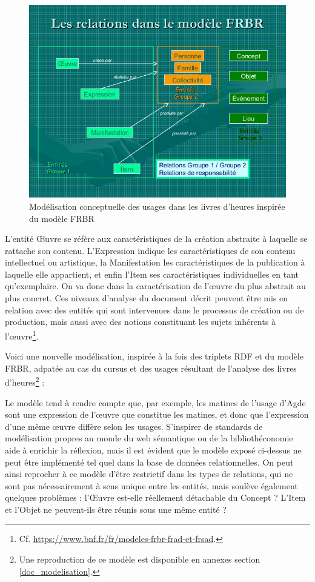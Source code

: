 \documentclass[a4paper,12pt,twoside]{book}
\begin{document}
	\begin{figure}[!h]
    \centering
    \includegraphics[width=15cm]{img/Modelisation/Modele_type_FRBR.jpg}
    \caption{Modélisation conceptuelle des usages dans les livres d'heures inspirée du modèle FRBR}
    \end{figure}
    \clearpage
    
    L'entité \og Œuvre\fg{} se réfère aux caractéristiques de la création abstraite à laquelle se rattache son contenu. L'\og Expression\fg{} indique les caractéristiques de son contenu intellectuel ou artistique, la \og Manifestation\fg{} les caractéristiques de la publication à laquelle elle appartient, et enfin l'\og Item\fg{} ses caractéristiques individuelles en tant qu’exemplaire. On va donc dans la caractérisation de l'œuvre du plus abstrait au plus concret. Ces niveaux d'analyse du document décrit peuvent être mis en relation avec des entités qui sont intervenues dans le processus de création ou de production, mais aussi avec des notions constituant les sujets inhérents à l'œuvre\footnote{Cf. \url{https://www.bnf.fr/fr/modeles-frbr-frad-et-frsad}.}. 
   
    Voici une nouvelle modélisation, inspirée à la fois des triplets RDF et du modèle FRBR, adpatée au cas du cursus et des usages résultant de l'analyse des livres d'heures\footnote{Une reproduction de ce modèle est disponible en annexes section \ref{doc_modelisation}.} : 
    
    
    Le modèle tend à rendre compte que, par exemple, les matines de l'usage d'Agde sont une expression de l'œuvre que constitue les matines, et donc que l'expression d'une même œuvre diffère selon les usages. S'inspirer de standards de modélisation propres au monde du web sémantique ou de la bibliothéconomie aide à enrichir la réflexion, mais il est évident que le modèle exposé ci-dessus ne peut être implémenté tel quel dans la base de données relationnelles. On peut ainsi reprocher à ce modèle d'être restrictif dans les types de relations, qui ne sont pas nécessairement à sens unique entre les entités, mais soulève également quelques problèmes : l'\og Œuvre\fg{} est-elle réellement détachable du \og Concept\fg{} ? L'\og Item\fg{} et l'\og Objet\fg{} ne peuvent-ils être réunis sous une même entité ? \\
    
\end{document}
